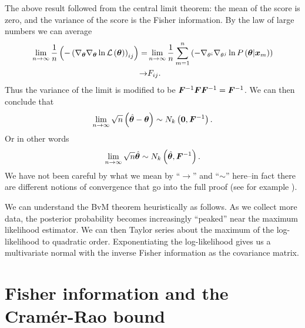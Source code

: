 The above result followed from the central limit theorem: the mean of the score is zero, 
and the variance of the score is the Fisher information.
By the law of large numbers we can average
\begin{align}
    \lim_{n\to\infty}
    \frac{1}{n}\left(-\left(\nabla_{{\bm \theta}}\nabla_{{\bm \theta}}\ln\mathcal{L}\left({\bm \theta}\right)\right)_{ij}\right)
    =&
    \lim_{n\to\infty}
    \frac{1}{n}\sum_{m=1}^n
    \left(-\nabla_{\theta^i}\nabla_{\theta^j}\ln P\left({\bm \theta}|{\bm x}_{m}\right)\right)
    \nonumber\\
    \to&
    F_{ij}
    .
\end{align}
Thus the variance of the limit is modified to be ${\bm F}^{-1}{\bm F}{\bm F}^{-1}={\bm F}^{-1}$.
We can then conclude that
\begin{align}
    \lim_{n\to\infty}\sqrt{n}\left(\hat{{\bm \theta}} - {\bm \theta}\right)
    \sim
    N_k\left({\bm 0},{\bm F}^{-1}\right)
    .
\end{align}
Or in other words
\begin{align}
    \lim_{n\to\infty}\sqrt{n}\hat{{\bm \theta}}
    \sim
    N_k\left(\hat{{\bm \theta}},{\bm F}^{-1}\right)
    .
\end{align}
We have not been careful by what we mean by ``$\to$'' and ``$\sim$'' here--in fact there
are different notions of convergence that go into the full proof
(see for example \cite{wasserman2010statistics}).

We can understand the BvM theorem heuristically as follows.
As we collect more data, the posterior probability becomes increasingly ``peaked'' near
the maximum likelihood estimator.
We can then Taylor series about the maximum of the log-likelihood to quadratic order.
Exponentiating the log-likelihood gives us a multivariate normal with the 
inverse Fisher information as the covariance matrix.

\section{Fisher information and the Cram\'{e}r-Rao bound}

